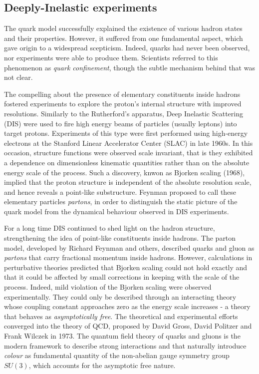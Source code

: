 \subsection*{Deeply-Inelastic experiments}

The quark model successfully explained the existence of various hadron states and their properties. However, it suffered from one fundamental aspect, which gave origin to a widespread scepticism. Indeed, quarks had never been observed, nor experiments were able to produce them. Scientists referred to this phenomenon as \textit{quark confinement}, though the subtle mechanism behind that was not clear.

The compelling about the presence of elementary constituents inside hadrons fostered experiments to explore the proton's internal structure with improved resolutions. Similarly to the Rutherford's apparatus, Deep Inelastic Scattering (DIS) were used to fire high energy beams of particles (usually leptons) into target protons. Experiments of this type were first performed using high-energy electrons at the Stanford Linear Accelerator Center (SLAC) in late 1960s. In this occasion, structure functions were observed scale invariant, that is they exhibited a dependence on dimensionless kinematic quantities rather than on the absolute energy scale of the process. Such a discovery, knwon as Bjorken scaling (1968), implied that the proton structure is independent of the absolute resolution scale, and hence reveals a point-like substructure. Feynman proposed to call these elementary particles \textit{partons}, in order to distinguish the static picture of the quark model from the dynamical behaviour observed in DIS experiments.%

For a long time DIS continued to shed light on the hadron structure, strengthening the idea of point-like constituents inside hadrons. The parton model, developed by Richard Feynman and others, described quarks and gluon as \textit{partons} that carry fractional momentum inside hadrons. However, calculations in perturbative theories predicted that Bjorken scaling could not hold exactly and that it could be affected by small corrections in keeping with the scale of the process. Indeed, mild violation of the Bjorken scaling were observed experimentally. They could only be described through an interacting theory whose coupling constant approaches zero as the energy scale increases - a theory that behaves as \textit{asymptotically free}. The theoretical and experimental efforts converged into the theory of QCD, proposed by David Gross, David Politzer and Frank Wilczek in 1973. The quantum field theory of quarks and gluons is the modern framework to describe strong interactions and that naturally introduce \textit{colour} as fundamental quantity of the non-abelian gauge symmetry group $SU(3)$, which accounts for the asymptotic free nature.


